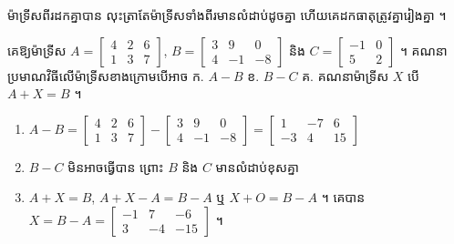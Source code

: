 \begin{formulaBox}[ជាទូទៅ]
ម៉ាទ្រីសពីរដកគ្នាបាន លុះត្រាតែម៉ាទ្រីសទាំងពីរមានលំដាប់ដូចគ្នា ហើយគេដកធាតុត្រូវគ្នារៀងគ្នា ។
\end{formulaBox}

\begin{example}[លំហាត់គំរូ ៤]
គេឱ្យម៉ាទ្រីស $A = \begin{bmatrix} 4 & 2 & 6\\ 1 & 3 & 7 \end{bmatrix}$, $B = \begin{bmatrix} 3 & 9 & 0\\ 4 & -1 & -8 \end{bmatrix}$ និង $C = \begin{bmatrix} -1 & 0\\ 5 & 2 \end{bmatrix}$ ។ គណនាប្រមាណវិធីលើម៉ាទ្រីសខាងក្រោមបើអាច \quad ក. $A - B$ \quad ខ. $B - C$ \quad គ. គណនាម៉ាទ្រីស $X$ បើ $A + X = B$ ។
\end{example}
\ans
\begin{enumerate}[a]
  \item $A - B = \begin{bmatrix} 4 & 2 & 6\\ 1 & 3 & 7 \end{bmatrix} - \begin{bmatrix} 3 & 9 & 0\\ 4 & -1 & -8 \end{bmatrix} = \begin{bmatrix} 1 & -7 & 6\\ -3 & 4 & 15 \end{bmatrix}$
  \item $B - C$ មិនអាចធ្វើបាន ព្រោះ $B$ និង $C$ មានលំដាប់ខុសគ្នា
  \item $A + X = B$, $A + X - A = B - A$ ឬ $X + O = B - A$ ។ គេបាន $X = B - A = \begin{bmatrix} -1 & 7 & -6\\ 3 & -4 & -15 \end{bmatrix}$ ។
\end{enumerate}

